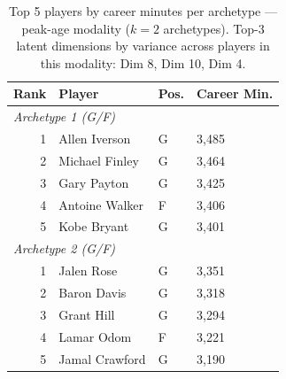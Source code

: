 \begin{table}[htbp]
  \centering\small
  \begin{tabular}{rlll}
    \toprule
    Rank & Player & Pos. & Career Min. \\
    \midrule
    \multicolumn{4}{l}{\textit{Archetype 1 (G/F)}} \\
    \midrule
    1 & Allen Iverson & G & 3,485 \\
    2 & Michael Finley & G & 3,464 \\
    3 & Gary Payton & G & 3,425 \\
    4 & Antoine Walker & F & 3,406 \\
    5 & Kobe Bryant & G & 3,401 \\
    \midrule[0.4pt]
    \multicolumn{4}{l}{\textit{Archetype 2 (G/F)}} \\
    \midrule
    1 & Jalen Rose & G & 3,351 \\
    2 & Baron Davis & G & 3,318 \\
    3 & Grant Hill & G & 3,294 \\
    4 & Lamar Odom & F & 3,221 \\
    5 & Jamal Crawford & G & 3,190 \\
    \bottomrule
  \end{tabular}
  \caption{Top 5 players by career minutes per archetype --- peak-age modality ($k=2$ archetypes). Top-3 latent dimensions by variance across players in this modality: Dim 8, Dim 10, Dim 4.}
  \label{tab:arch_reps_peak_age}
\end{table}

